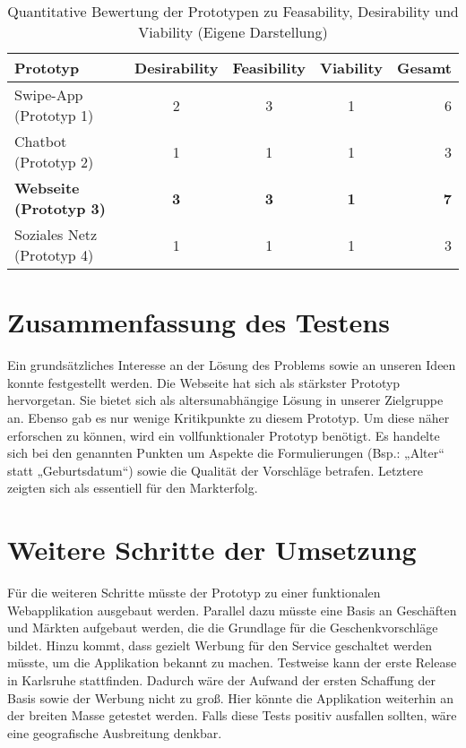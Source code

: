 \documentclass[12pt,ngerman, fleqn]{book} %
\begin{document}
\begin{table}[ht]
\begin{center}
\begin{tabular}{l*{3}{c}r}
Prototyp & Desirability & Feasibility & Viability & Gesamt\\
\hline
Swipe-App (Prototyp 1) & 2 & 3 & 1 & 6\\
Chatbot (Prototyp 2) & 1 & 1 & 1 & 3 \\
\textbf{Webseite (Prototyp 3)} & \textbf{3}  & \textbf{3} & \textbf{1} & \textbf{7}\\
Soziales Netz (Prototyp 4) & 1 & 1 & 1 & 3\\
\hline
\end{tabular}
\end{center}
\caption{Quantitative Bewertung der Prototypen zu Feasability, Desirability und Viability (Eigene Darstellung)}
\label{tab:quantitative_bewertung_prototyp}
\end{table}%

\section{Zusammenfassung des Testens}
Ein grundsätzliches Interesse an der Lösung des Problems sowie an unseren Ideen konnte festgestellt werden. Die Webseite hat sich als stärkster Prototyp hervorgetan. Sie bietet sich als altersunabhängige Lösung in unserer Zielgruppe an. Ebenso gab es nur wenige Kritikpunkte zu diesem Prototyp. Um diese näher erforschen zu können, wird ein vollfunktionaler Prototyp benötigt. Es handelte sich bei den genannten Punkten um Aspekte die Formulierungen (Bsp.: „Alter“ statt „Geburtsdatum“) sowie die Qualität der Vorschläge betrafen. Letztere zeigten sich als essentiell für den Markterfolg.

\section{Weitere Schritte der Umsetzung}
Für die weiteren Schritte müsste der Prototyp zu einer funktionalen Webapplikation ausgebaut werden. Parallel dazu müsste eine Basis an Geschäften und Märkten aufgebaut werden, die die Grundlage für die Geschenkvorschläge bildet. Hinzu kommt, dass gezielt Werbung für den Service geschaltet werden müsste, um die Applikation bekannt zu machen. Testweise kann der erste Release in Karlsruhe stattfinden. Dadurch wäre der Aufwand der ersten Schaffung der Basis sowie der Werbung nicht zu groß. Hier könnte die Applikation weiterhin an der breiten Masse getestet werden. Falls diese Tests positiv ausfallen sollten, wäre eine geografische Ausbreitung denkbar.
\end{document}
